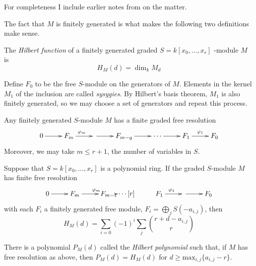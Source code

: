 \medskip\noindent
For completeness I include earlier notes
from \cite{har} on the matter.

The fact that $M$ is finitely generated is what makes the following two
definitions make sense.

\begin{definition}
\label{definition-Hilbert-function}
The {\it Hilbert function} of a finitely generated graded $S=k[x_0,\ldots,x_r]$ 
-module $M$ is
$$
H_M(d)=\dim_kM_d
$$
\end{definition}

\begin{definition}
\label{definition-sysygy}
Define $F_0$ to be the free $S$-module on the generators of $M$. Elements in the
 kernel $M_1$ of the inclusion are called {\it sysygies}. By Hilbert's basis
theorem, $M_1$ is also finitely generated, so we may choose a set of generators
and repeat this process.
\end{definition}

\begin{theorem}
\label{theorem-Hilbert-syzygy}
\begin{reference}
\cite[Theorem 1.1]{sys}
\end{reference}
Any finitely generated $S$-module $M$ has a finite graded free resolution
$$
\xymatrix{
0\ar[r]&F_m\ar[r]^{\varphi_m}&\ar[r]&F_{m-q}\ar[r]&\cdots\ar[r]&
F_1\ar[r]^{\varphi_1}&F_0
}
$$
Moreover, we may take $m\leq r+1$, the number of variables in $S$.
\end{theorem}

\begin{lemma}
\label{lemma-Hilbert-function}
Suppose that $S=k[x_0,\ldots,x_r]$ is a polynomial ring. If the graded
$S$-module $M$ has finite free resolution
$$
\xymatrix{
0\ar[r]&F_m\ar[r]^{\varphi_m}&F_{m-1}\ar\cdots[r]&F_1\ar[r]^{\varphi_1}&
\ar[r]&F_0
}
$$
with each $F_i$ a finitely generated free module,
$F_i=\bigoplus_{j}S(-a_{i,j})$, then
\begin{equation}
\label{equation-Hilbert-function}
H_M(d)=\sum_{i=0}(-1)^i\sum_{j}\binom{r+d-a_{i,j}}{r}
\end{equation}
\end{lemma}

\begin{lemma}
\label{lemma-Hilbert-function-becomes-polynomial}
There is a polynomial $P_M(d)$ called the {\it Hilbert polynomial} such that, if
$M$ has free resolution as above, then $P_M(d)=H_M(d)$ for 
$d\geq\text{max}_{i,j}\{a_{i,j}-r\}$.
\end{lemma}

